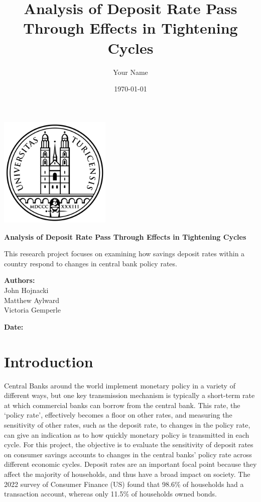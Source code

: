 \documentclass{article}
\title{\textbf{Analysis of Deposit Rate Pass Through Effects in Tightening Cycles}}
\author{Your Name}
\date{\today}
\begin{document}
\begin{titlepage}
    \centering
    \vspace*{-1.5cm} %
    \includegraphics[width=0.4\textwidth]{figures/University_of_Zurich_seal.png} %
    
    \vspace{2cm}
    \Huge
    \textbf{Analysis of Deposit Rate Pass Through Effects in Tightening Cycles}
    
    \vspace{1cm}
    \LARGE
    This research project focuses on examining how savings deposit rates within a country respond to changes in central bank policy rates. 
    
    \vspace{1cm}
    \textbf{Authors:}\\ John Hojnacki \\ Matthew Aylward \\ Victoria Gemperle
    \vspace{1cm}
    
    \textbf{Date:}\\
    \thedate
    \vfill
    
\end{titlepage}


\section{Introduction}

    \linespread{1}  %
    
Central Banks around the world implement monetary policy in a variety of different ways, but one key transmission mechanism is typically a short-term rate at which commercial banks can borrow from the central bank. This rate, the ‘policy rate’, effectively becomes a floor on other rates, and measuring the sensitivity of other rates, such as the deposit rate, to changes in the policy rate, can give an indication as to how quickly monetary policy is transmitted in each cycle. For this project, the objective is to evaluate the sensitivity of deposit rates on consumer savings accounts to changes in the central banks’ policy rate across different economic cycles. Deposit rates are an important focal point because they affect the majority of households, and thus have a broad impact on society. The 2022 survey of Consumer Finance (US) found that 98.6\% of households had a transaction account, whereas only 11.5\% of households owned bonds\cite{scf2022}.\\
\end{document}
